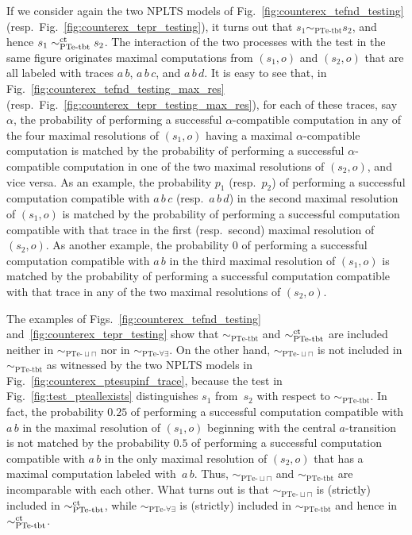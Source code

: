 \documentclass{LMCS}
\newcommand{\sbis}[1]
	{\sim_{#1}}
\begin{document}
If we consider again the two NPLTS models of Fig.~\ref{fig:counterex_tefnd_testing} (resp.\
Fig.~\ref{fig:counterex_tepr_testing}), it turns out that $s_{1} \sbis{\textrm{PTe-tbt}} s_{2}$, and hence
$s_{1} \sbis{\textrm{PTe-tbt}}^{\rm ct} s_{2}$. The interaction of the two processes with the test in the
same figure originates maximal computations from $(s_{1}, o)$ and $(s_{2}, o)$ that are all labeled with
traces $a \, b$, $a \, b \, c$, and $a \, b \, d$. It is easy to see that, in
Fig.~\ref{fig:counterex_tefnd_testing_max_res} (resp.\ Fig.~\ref{fig:counterex_tepr_testing_max_res}), for
each of these traces, say $\alpha$, the probability of performing a successful $\alpha$-compatible
computation in any of the four maximal resolutions of $(s_{1}, o)$ having a maximal $\alpha$-compatible
computation is matched by the probability of performing a successful $\alpha$-compatible computation in one
of the two maximal resolutions of $(s_{2}, o)$, and vice versa. As an example, the probability $p_{1}$
(resp.~$p_{2}$) of performing a successful computation compatible with $a \, b \, c$ (resp.~$a \, b \, d$)
in the second maximal resolution of $(s_{1}, o)$ is matched by the probability of performing a successful
computation compatible with that trace in the first (resp.\ second) maximal resolution of~$(s_{2}, o)$. As
another example, the probability $0$ of performing a successful computation compatible with $a \, b$ in the
third maximal resolution of $(s_{1}, o)$ is matched by the probability of performing a successful
computation compatible with that trace in any of the two maximal resolutions of $(s_{2}, o)$.

The examples of Figs.~\ref{fig:counterex_tefnd_testing} and~\ref{fig:counterex_tepr_testing} show that
$\sbis{\textrm{PTe-tbt}}$ and $\sbis{\textrm{PTe-tbt}}^{\rm ct}$ are included neither in
$\sbis{\textrm{PTe-}\sqcup\sqcap}$ nor in $\sbis{\textrm{PTe-}\forall\exists}$. On the other hand,
$\sbis{\textrm{PTe-}\sqcup\sqcap}$ is not included in $\sbis{\textrm{PTe-tbt}}$ as witnessed by the two
NPLTS models in Fig.~\ref{fig:counterex_ptesupinf_trace}, because the test in
Fig.~\ref{fig:test_pteallexists} distinguishes $s_{1}$ from~$s_{2}$ with respect to
$\sbis{\textrm{PTe-tbt}}$. In fact, the probability $0.25$ of performing a successful computation compatible
with $a \, b$ in the maximal resolution of $(s_{1}, o)$ beginning with the central $a$-transition is not
matched by the probability $0.5$ of performing a successful computation compatible with $a \, b$ in the only
maximal resolution of $(s_{2}, o)$ that has a maximal computation labeled with~$a \, b$. Thus,
$\sbis{\textrm{PTe-}\sqcup\sqcap}$ and $\sbis{\textrm{PTe-tbt}}$ are incomparable with each other. What
turns out is that $\sbis{\textrm{PTe-}\sqcup\sqcap}$ is (strictly) included in $\sbis{\textrm{PTe-tbt}}^{\rm
ct}$, while $\sbis{\textrm{PTe-}\forall\exists}$ is (strictly) included in $\sbis{\textrm{PTe-tbt}}$ and
hence in $\sbis{\textrm{PTe-tbt}}^{\rm ct}$.
\end{document}
